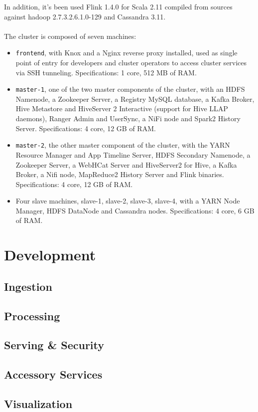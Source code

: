 In addition, it's been used Flink 1.4.0 for Scala 2.11 compiled from sources against hadoop 2.7.3.2.6.1.0-129 and Cassandra 3.11.
\\
\\
The cluster is composed of seven machines:
\begin{itemize}
    \item \texttt{frontend}, with Knox and a Nginx reverse proxy installed, used as single point of entry for developers and cluster operators to access cluster services via SSH tunneling. Specifications: 1 core, 512 MB of RAM.
    \item \texttt{master-1}, one of the two master components of the cluster, with an HDFS Namenode, a Zookeeper Server, a Registry MySQL database, a Kafka Broker, Hive Metastore and HiveServer 2 Interactive (support for Hive LLAP daemons), Ranger Admin and UserSync, a NiFi node and Spark2 History Server. Specifications: 4 core, 12 GB of RAM.
    \item \texttt{master-2}, the other master component of the cluster, with the YARN Resource Manager and App Timeline Server, HDFS Secondary Namenode, a Zookeeper Server, a WebHCat Server and HiveServer2 for Hive, a Kafka Broker, a Nifi node, MapReduce2 History Server and Flink binaries. Specifications: 4 core, 12 GB of RAM.
    \item Four slave machines, slave-1, slave-2, slave-3, slave-4, with a YARN Node Manager, HDFS DataNode and Cassandra nodes. Specifications: 4 core, 6 GB of RAM.
\end{itemize}

\section{Development}

\subsection{Ingestion}

\subsection{Processing}

\subsection{Serving \& Security}

\subsection{Accessory Services}

\subsection{Visualization}